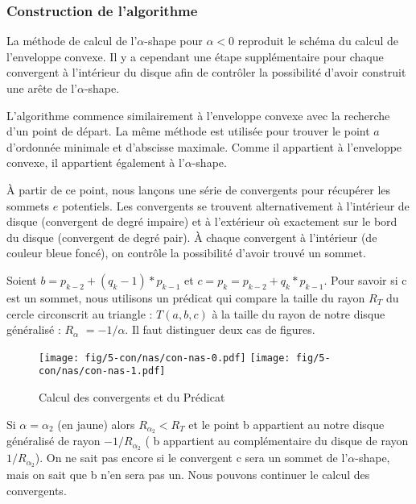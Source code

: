 \subsubsection{Construction de l'algorithme}

La méthode de calcul de l'$\alpha$-shape pour $\alpha <0$ reproduit le schéma du calcul de l’enveloppe convexe. Il y a cependant une étape supplémentaire pour chaque convergent à l'intérieur du disque afin de contrôler la possibilité d'avoir construit une arête de l'$\alpha$-shape.

L'algorithme commence similairement à l'enveloppe convexe avec la recherche d'un point de départ. La même méthode est utilisée pour trouver le point $a$ d'ordonnée minimale et d'abscisse maximale. Comme il appartient à l'enveloppe convexe, il appartient également à l'$\alpha$-shape.

À partir de ce point, nous lançons une série de convergents pour récupérer les sommets $e$ potentiels. Les convergents se trouvent alternativement à l'intérieur de disque (convergent de degré impaire) et à l'extérieur où exactement sur le bord du disque (convergent de degré pair). À chaque convergent à l'intérieur (de couleur bleue foncé), on contrôle la possibilité d'avoir trouvé un sommet.

Soient  $b = p_{k-2} + (q_k - 1) * p_{k-1}$ et $c = p_k = p_{k-2} + q_k * p_{k-1}$. Pour savoir si c est un sommet, nous utilisons un prédicat qui compare la taille du rayon \textbf{$R_T$} du cercle circonscrit au triangle : $T(a, b, c)$ à la taille du rayon de notre disque généralisé : \textbf{$R_{\alpha}$} $= -1/\alpha$. Il faut distinguer deux cas de figures.\\

\begin{figure}[H]
  \centering
  \texttt{[image: fig/5-con/nas/con-nas-0.pdf]}
  \texttt{[image: fig/5-con/nas/con-nas-1.pdf]}
  \caption{Calcul des convergents et du Prédicat}
\end{figure}

Si $\alpha = \alpha_{2}$ (en jaune) alors \textbf{$R_{\alpha_{2}} < R_T$} et le point b appartient au notre disque généralisé de rayon $-1/R_{\alpha_{2}}$ ( b appartient au complémentaire du disque de rayon $1/R_{\alpha_{2}}$). On ne sait pas encore si le convergent c sera un sommet de l'$\alpha$-shape, mais on sait que b n'en sera pas un. Nous pouvons continuer le calcul des convergents.\\ 

